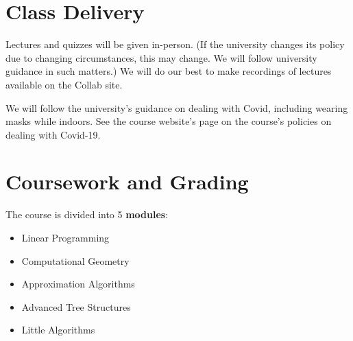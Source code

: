 \documentclass[12pt]{article}
\begin{document}
\section*{Class Delivery}

Lectures and quizzes will be given in-person.  (If the university changes its policy due to changing circumstances, this may change. We will follow university guidance in such matters.) We will do our best to make recordings of lectures available on the Collab site.

We will follow the university's guidance on dealing with Covid, including wearing masks while indoors. See the course website's page on the course's policies on dealing with Covid-19.



\section*{Coursework and Grading}

The course is divided into 5 {\bf modules}:
\begin{itemize}
    \item Linear Programming
    \item Computational Geometry
    \item Approximation Algorithms
    \item Advanced Tree Structures
    \item Little Algorithms
\end{itemize}
\end{document}
